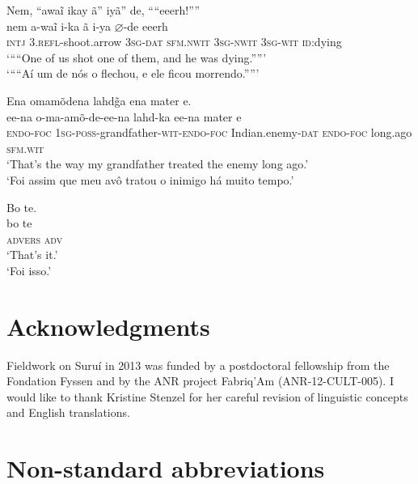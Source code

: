\documentclass[output=paper,
modfonts,nonflat
]{langsci/langscibook}
\begin{document}
  
\ea Nem, “awaĩ ikay ã” iyã” de, ““eeerh!””\\[.3em]
\gll nem a-waĩ i-ka ã i-ya \(\varnothing\)-de eeerh\\
\textsc{intj} \textsc{3.refl}-shoot.arrow \textsc{3sg-dat} \textsc{sfm.nwit} \textsc{3sg-nwit} \textsc{3sg-wit} \textsc{id}:dying\\
\glt ‘““One of us shot one of them, and he was dying.””’\\
\glt ‘““Aí um de nós o flechou, e ele ficou morrendo.””’\\
\z

  
\ea Ena omamõdena lahd\~{g}a ena mater e.\\[.3em]
\gll ee-na o-ma-amõ-de-ee-na lahd-ka ee-na mater e\\
\textsc{endo-foc} \textsc{1sg-poss}-grandfather-\textsc{wit-endo-foc} Indian.enemy-\textsc{dat} \textsc{endo-foc} long.ago \textsc{sfm.wit}\\
\glt ‘That’s the way my grandfather treated the enemy long ago.’\\
\glt ‘Foi assim que meu avô tratou o inimigo há muito tempo.’\\
\z

\largerpage[2]
\ea Bo te.\\[.3em]
\gll bo te\\
\textsc{advers} \textsc{adv}\\
\glt ‘That’s it.’\\
\glt ‘Foi isso.’\\
\z
\newpage
\section*{Acknowledgments}
Fieldwork on Suruí in 2013 was funded by a postdoctoral fellowship from the Fondation Fyssen and by the ANR project Fabriq’Am (ANR-12-CULT-005). I would like to thank Kristine Stenzel for her careful revision of linguistic concepts and English translations.

\section*{Non-standard abbreviations}
\end{document}
